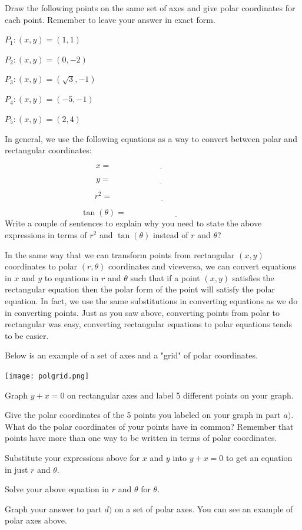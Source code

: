 \bq Draw the following points on the same set of axes and give polar coordinates for each point. Remember to leave your answer in exact form.
\be
\item $P_1:(x,y)=(1,1) $
\item $P_2:(x,y)=(0,-2)$
\item $P_3:(x,y)=(\sqrt{3}, -1)$
\item $P_4:(x,y)=(-5,-1)$
\item $P_5:(x,y)=(2,4)$
\ee
\eq

\bq \label{q55}In general, we use the following equations as a way to convert between polar and rectangular coordinates:

$$ x = \underline{\hspace{2in}} $$

$$ y = \underline{\hspace{2in}} $$

$$ r^2 = \underline{\hspace{2in}} $$

$$ \tan(\theta) = \underline{\hspace{2in}} $$
\eq
\bq
Write a couple of sentences to explain why you need to state the above expressions in terms of $r^2$ and $\tan(\theta)$ instead of $r$ and $\theta$?
\eq

In the same way that we can transform points from rectangular $(x,y)$ coordinates to polar $(r,\theta)$ coordinates and viceversa, we can convert equations in $x$ and $y$ to equations in $r$ and $\theta$ such that if a point $(x,y)$ satisfies the rectangular equation then the polar form of the point will satisfy the polar equation. In fact, we use the same substitutions in converting equations as we do in converting points. Just as you saw above, converting points from polar to rectangular was easy, converting rectangular equations to polar equations tends to be easier.

Below is an example of a set of axes and a "grid" of polar coordinates.
\begin{center} \texttt{[image: polgrid.png]} \end{center}

\bq \be
\item Graph $y+x=0$ on rectangular axes and label 5 different points on your graph.
\item Give the polar coordinates of the 5 points you labeled on your graph in part $a)$. What do the polar coordinates of your points have in common? Remember that points have more than one way to be written in terms of polar coordinates.
\item Substitute your expressions above for $x$ and $y$ into $y+x=0$ to get an equation in just $r$ and $\theta$.
\item Solve your above equation in $r$ and $\theta$ for $\theta$.
\item Graph your answer to part $d)$ on a set of polar axes. You can see an example of polar axes above.
\ee
\eq

